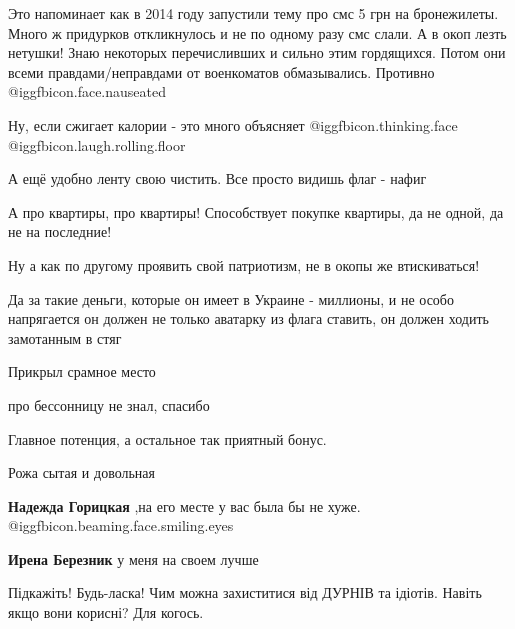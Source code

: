  
 
 
 
 
\zzSecCmt

\begin{itemize} %

Это напоминает как в 2014 году запустили тему про смс 5 грн на бронежилеты.
Много ж придурков откликнулось и не по одному разу смс слали. А в окоп лезть
нетушки! Знаю некоторых перечисливших и сильно этим гордящихся. Потом они всеми
правдами/неправдами от военкоматов обмазывались. Противно  @igg{fbicon.face.nauseated} 

Ну, если сжигает калории - это много объясняет @igg{fbicon.thinking.face}  @igg{fbicon.laugh.rolling.floor} 

А ещё удобно ленту свою чистить. Все просто видишь флаг - нафиг

А про квартиры, про квартиры! Способствует покупке квартиры, да не одной, да не на последние!

Ну а как по другому проявить свой патриотизм, не в окопы же втискиваться!


Да за такие деньги, которые он имеет в Украине - миллионы, и не особо
напрягается он должен не только аватарку из флага ставить, он должен ходить
замотанным в стяг

Прикрыл срамное место

про бессонницу не знал, спасибо

Главное потенция, а остальное так приятный бонус.

Рожа сытая и довольная

\textbf{Надежда Горицкая} ,на его месте у вас была бы не хуже. @igg{fbicon.beaming.face.smiling.eyes} 

\textbf{Ирена Березник} у меня на своем лучше

Підкажіть! Будь-ласка! Чим можна захиститися від ДУРНІВ та ідіотів. Навіть якщо вони корисні? Для когось.


\end{itemize}
